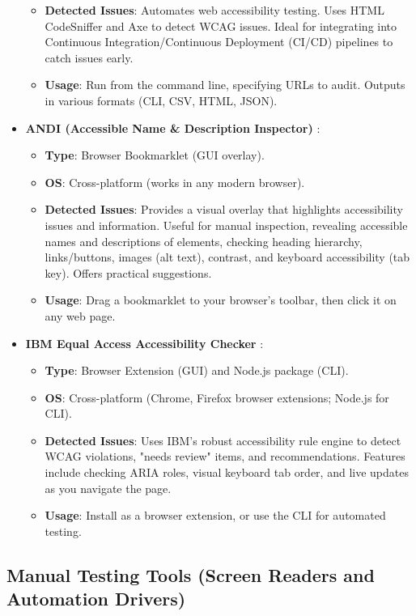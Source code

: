 \begin{itemize}
\begin{itemize}
            \item \textbf{Detected Issues}: Automates web accessibility testing. Uses HTML CodeSniffer and Axe to detect WCAG issues. Ideal for integrating into Continuous Integration/Continuous Deployment (CI/CD) pipelines to catch issues early.
            \item \textbf{Usage}: Run from the command line, specifying URLs to audit. Outputs in various formats (CLI, CSV, HTML, JSON).
        \end{itemize}
    \item \textbf{ANDI (Accessible Name \& Description Inspector)} \cite{ANDI}:
        \begin{itemize}
            \item \textbf{Type}: Browser Bookmarklet (GUI overlay).
            \item \textbf{OS}: Cross-platform (works in any modern browser).
            \item \textbf{Detected Issues}: Provides a visual overlay that highlights accessibility issues and information. Useful for manual inspection, revealing accessible names and descriptions of elements, checking heading hierarchy, links/buttons, images (alt text), contrast, and keyboard accessibility (tab key). Offers practical suggestions.
            \item \textbf{Usage}: Drag a bookmarklet to your browser's toolbar, then click it on any web page.
        \end{itemize}
    \item \textbf{IBM Equal Access Accessibility Checker} \cite{IBMChecker}:
        \begin{itemize}
            \item \textbf{Type}: Browser Extension (GUI) and Node.js package (CLI).
            \item \textbf{OS}: Cross-platform (Chrome, Firefox browser extensions; Node.js for CLI).
            \item \textbf{Detected Issues}: Uses IBM's robust accessibility rule engine to detect WCAG violations, "needs review" items, and recommendations. Features include checking ARIA roles, visual keyboard tab order, and live updates as you navigate the page.
            \item \textbf{Usage}: Install as a browser extension, or use the CLI for automated testing.
        \end{itemize}
\end{itemize}

\subsection{Manual Testing Tools (Screen Readers and Automation Drivers)}
\label{subsec:manual-testing-tools}

